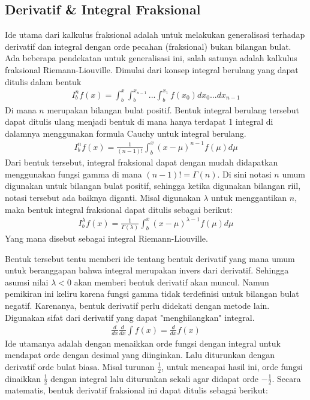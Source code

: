 \subsection{Derivatif \& Integral Fraksional}
Ide utama dari kalkulus fraksional adalah untuk melakukan generalisasi terhadap derivatif dan integral dengan orde pecahan (fraksional) bukan bilangan bulat. Ada beberapa pendekatan untuk generalisasi ini, salah satunya adalah kalkulus fraksional Riemann-Liouville. Dimulai dari konsep integral berulang yang dapat ditulis dalam bentuk
\begin{align}
    I_b^n f(x) = \int_b^x \int_b^{x_{n-1}} ... \int_b^{x_1} f(x_0)dx_0 ... dx_{n-1}
\end{align}
Di mana \(n\) merupakan bilangan bulat positif. Bentuk integral berulang tersebut dapat ditulis ulang menjadi bentuk di mana hanya terdapat 1 integral di dalamnya menggunakan formula Cauchy untuk integral berulang. 
\begin{align}
    I_b^n f(x) = \frac{1}{(n-1)!}\int_b^x (x-\mu)^{n-1}f(\mu)d\mu
\end{align}
Dari bentuk tersebut, integral fraksional dapat dengan mudah didapatkan menggunakan fungsi gamma di mana \((n-1)!=\Gamma(n)\). Di sini notasi \(n\) umum digunakan untuk bilangan bulat positif, sehingga ketika digunakan bilangan riil, notasi tersebut ada baiknya diganti. Misal digunakan \(\lambda\) untuk menggantikan \(n\), maka bentuk integral fraksional dapat ditulis sebagai berikut:
\begin{align}
    I_b^\lambda f(x) = \frac{1}{\Gamma(\lambda)}\int_b^x (x-\mu)^{\lambda-1}f(\mu)d\mu
\end{align}
Yang mana disebut sebagai integral Riemann-Liouville.
\par Bentuk tersebut tentu memberi ide tentang bentuk derivatif yang mana umum untuk beranggapan bahwa integral merupakan invers dari derivatif. Sehingga asumsi nilai \(\lambda<0\) akan memberi bentuk derivatif akan muncul. Namun pemikiran ini keliru karena fungsi gamma tidak terdefinisi untuk bilangan bulat negatif. Karenanya, bentuk derivatif perlu didekati dengan metode lain. Digunakan sifat dari derivatif yang dapat "menghilangkan" integral.
\begin{align}
    \frac{d}{dx}\frac{d}{dx}\int f(x) = \frac{d}{dx} f(x)
\end{align}
Ide utamanya adalah dengan menaikkan orde fungsi dengan integral untuk mendapat orde dengan desimal yang diinginkan. Lalu diturunkan dengan derivatif orde bulat biasa. Misal turunan \(\frac{1}{2}\), untuk mencapai hasil ini, orde fungsi dinaikkan \(\frac{1}{2}\) dengan integral lalu diturunkan sekali agar didapat orde \(-\frac{1}{2}\). Secara matematis, bentuk derivatif fraksional ini dapat ditulis sebagai berikut:
